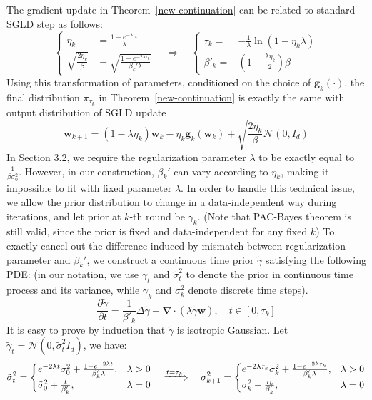 \documentclass[final,12pt]{colt2018} %
\begin{document}
The gradient update in Theorem~\ref{new-continuation} can be related to standard SGLD step as follows:
\begin{equation}
  \begin{cases}
  \eta_k&=\frac{1- e^{- \lambda \tau_k}}{\lambda}\\
\sqrt{\frac{2\eta_k}{\beta}}&=\sqrt{\frac{1- e^{-2 \lambda \tau_k}}{ \beta_k' \lambda}}
  \end{cases}\quad
  \Longrightarrow\quad
  \begin{cases}
  \tau_k=&-\frac{1}{\lambda}\ln(1- \eta_k\lambda)\\
  \beta'_k=&\left(1-\frac{\lambda\eta_k}{2}\right)\beta
  \end{cases}
\end{equation}
Using this transformation of parameters, conditioned on the choice of $\bm{g}_k(\cdot)$, the final distribution $\pi_{\tau_k}$ in Theorem~\ref{new-continuation} is exactly the same with output distribution of SGLD update 
\begin{equation}
  \bm{w}_{k+1}=(1-\lambda\eta_k)\bm{w}_k-\eta_k\bm{g}_k(\bm{w}_k)+\sqrt{\frac{2\eta_k}{\beta}} \mathcal{N}(0,I_d)
\end{equation}
In Section 3.2, we require the regularization parameter $\lambda$ to be exactly equal to $\frac{1}{\beta\sigma_0^2}$. However, in our construction, $\beta_k'$ can vary according to $\eta_k$, making it impossible to fit with fixed parameter $\lambda$. In order to handle this technical issue, we allow the prior distribution to change in a data-independent way during iterations, and let prior at $k$-th round be $\gamma_k$. (Note that PAC-Bayes theorem is still valid, since the prior is fixed and data-independent for any fixed $k$) To exactly cancel out the difference induced by mismatch between regularization parameter and $\beta_k'$, we construct a continuous time prior $\tilde{\gamma}$ satisfying the following PDE: (in our notation, we use $\tilde{\gamma}_t$ and $\tilde{\sigma}_t^2$ to denote the prior in continuous time process and its variance, while $\gamma_k$ and $\sigma_k^2$ denote discrete time steps).
\begin{equation}
  \frac{\partial\tilde{\gamma}}{\partial t}=\frac{1}{\beta'_k}\Delta \tilde{\gamma}+\bm{\nabla}\cdot(\lambda \tilde{\gamma} \bm{w}),\quad t\in[0,\tau_k]
\end{equation}
It is easy to prove by induction that $\tilde{\gamma}$ is isotropic Gaussian. Let $\tilde{\gamma}_t=\mathcal{N}(0,\tilde{\sigma}_t^2 I_d)$, we have:
\begin{equation}
\tilde{\sigma}_t^2=
  \begin{cases}
  e^{-2\lambda t}\tilde{\sigma}_0^2+\frac{1-e^{-2\lambda t}}{\beta_k' \lambda},&\lambda>0\\
  \tilde{\sigma}_0^2+\frac{t}{\beta_k'},&\lambda=0
  \end{cases}\quad
  \xRightarrow{t=\tau_k}\quad
  \sigma_{k+1}^2=
  \begin{cases}
  e^{-2\lambda \tau_k}\sigma_k^2+\frac{1-e^{-2\lambda \tau_k}}{\beta_k' \lambda},&\lambda>0\\
  \sigma_k^2+\frac{\tau_k}{\beta_k'},&\lambda=0
  \end{cases}
\end{equation}
\end{document}
